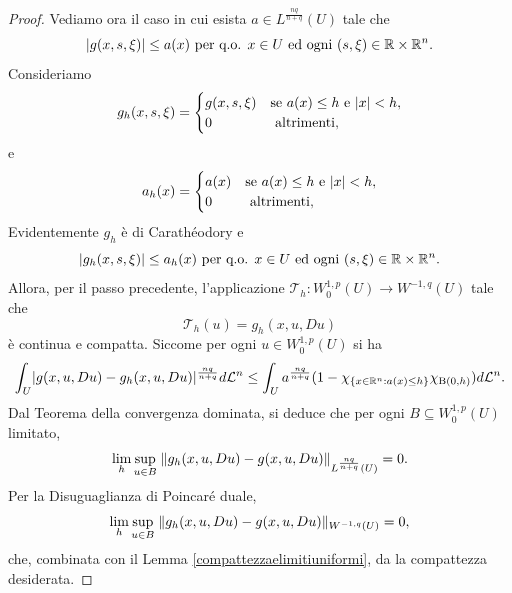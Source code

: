 \begin{proof}
Vediamo ora il caso in cui esista $a \in L^{\frac{nq}{n+q}}(U)$ tale che 
\[ \lvert g(x,s,\xi)\rvert \le a(x) \textup{ per q.o. } x \in U \textup{ ed ogni } (s,\xi) \in \mathbb{R}\times \mathbb{R}^n. \]
Consideriamo 
\[ g_h(x,s,\xi) = \begin{cases}
	g(x,s,\xi) & \textup{se } a(x) \le h \textup{ e } \lvert x\rvert<h,\\
	0 & \textup{ altrimenti},
\end{cases} \]
e 
\[ a_h(x) = \begin{cases}
	a(x) & \textup{se } a(x) \le h \textup{ e } \lvert x\rvert<h,\\
	0 & \textup{ altrimenti},
\end{cases} \]
Evidentemente $g_h$ è di Carathéodory e 
\[ \lvert g_h(x,s,\xi)\rvert \le a_h(x) \textup{ per q.o. } x \in U \textup{ ed ogni } (s,\xi) \in \mathbb{R}\times \mathbb{R}^n. \]
Allora, per il passo precedente, l'applicazione $\mathcal{T}_h: W^{1,p}_0(U) \to W^{-1,q}(U)$ tale che
\[ \mathcal{T}_h(u) = g_h(x,u,Du) \]
è continua e compatta. Siccome per ogni $u \in W^{1,p}_0(U)$ si ha
\[ \int_U \lvert g(x,u,Du) - g_h(x,u,Du)\rvert^{\frac{nq}{n+q}}d\mathcal{L}^n \le \int_U a^{\frac{nq}{n+q}}(1-\chi_{\left\lbrace x \in \mathbb{R}^n: a(x)\le h\right\rbrace}\chi_{\textup{B}(0,h)})d\mathcal{L}^n. \]
Dal Teorema della convergenza dominata, si deduce che per ogni $B \subseteq W^{1,p}_0(U)$ limitato,
\[ \lim\limits_{h} \underset{u \in B}{\sup}\; \lVert g_h(x,u,Du) -g(x,u,Du)\rVert_{L^{\frac{nq}{n+q}}(U)} = 0.  \]
Per la Disuguaglianza di Poincaré duale, 
\[ \lim\limits_{h} \underset{u \in B}{\sup}\; \lVert g_h(x,u,Du) -g(x,u,Du)\rVert_{W^{-1,q}(U)} = 0,  \]
che, combinata con il Lemma \eqref{compattezzaelimitiuniformi}, da la compattezza desiderata.


\end{proof}
